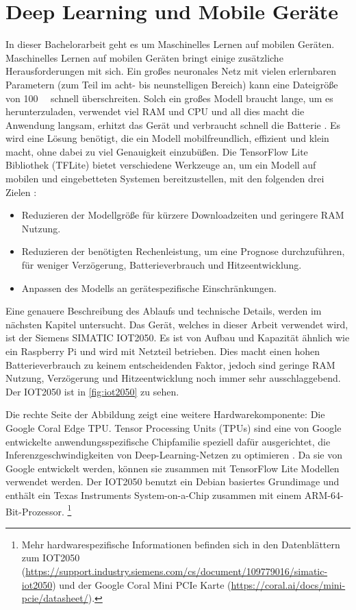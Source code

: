\section{Deep Learning und Mobile Geräte}
\label{sec:dl-mobile}
In dieser Bachelorarbeit geht es um Maschinelles Lernen auf mobilen Geräten.
Maschinelles Lernen auf mobilen Geräten bringt einige
zusätzliche Herausforderungen mit sich.
Ein großes neuronales Netz mit vielen erlernbaren
Parametern (zum Teil im acht- bis neunstelligen Bereich) kann eine Dateigröße von
\qty{100}{\mega\byte} schnell überschreiten.
Solch ein großes Modell braucht lange, um es herunterzuladen,
verwendet viel RAM und CPU und all dies macht die Anwendung langsam,
erhitzt das Gerät und verbraucht schnell die Batterie \parencite[685]{book:hands-on-ml}.
Es wird eine Lösung benötigt, die ein Modell mobilfreundlich,
effizient und klein macht, ohne dabei zu viel Genauigkeit einzubüßen.
Die TensorFlow Lite Bibliothek (TFLite)
bietet verschiedene Werkzeuge an, um ein Modell auf mobilen und eingebetteten
Systemen bereitzustellen, mit den folgenden drei Zielen \parencite[685]{book:hands-on-ml}:
\begin{itemize}
  \item Reduzieren der Modellgröße für kürzere Downloadzeiten und
        geringere RAM Nutzung.
  \item Reduzieren der benötigten Rechenleistung, um eine Prognose durchzuführen,
        für weniger Verzögerung, Batterieverbrauch und Hitzeentwicklung.
  \item Anpassen des Modells an gerätespezifische Einschränkungen.
\end{itemize}
Eine genauere Beschreibung des Ablaufs und technische Details, werden
im nächsten Kapitel untersucht.
Das Gerät, welches in dieser Arbeit verwendet wird, ist der Siemens SIMATIC
IOT2050. Es ist von Aufbau und Kapazität ähnlich wie ein Raspberry Pi
und wird mit Netzteil betrieben.
Dies macht einen hohen Batterieverbrauch zu keinem entscheidenden Faktor,
jedoch sind geringe RAM Nutzung, Verzögerung und Hitzeentwicklung
noch immer sehr ausschlaggebend.
Der IOT2050 ist in \autoref{fig:iot2050} zu sehen.
\newpage

\noindent
Die rechte Seite der Abbildung zeigt eine weitere Hardwarekomponente:
Die Google Coral Edge TPU. Tensor Processing Units (TPUs)
sind eine von Google entwickelte anwendungsspezifische Chipfamilie
speziell dafür ausgerichtet, die Inferenzgeschwindigkeiten
von Deep-Learning-Netzen zu optimieren \parencite{online:edge-tpu}.
Da sie von Google entwickelt werden, können sie zusammen
mit TensorFlow Lite Modellen verwendet werden. Der IOT2050 benutzt
ein Debian basiertes Grundimage und enthält ein
Texas Instruments System-on-a-Chip zusammen mit einem ARM-64-Bit-Prozessor.
\footnote{Mehr hardwarespezifische Informationen befinden sich in den Datenblättern zum
  IOT2050 (\url{https://support.industry.siemens.com/cs/document/109779016/simatic-iot2050})
  und der Google Coral Mini PCIe Karte (\url{https://coral.ai/docs/mini-pcie/datasheet/}).}

